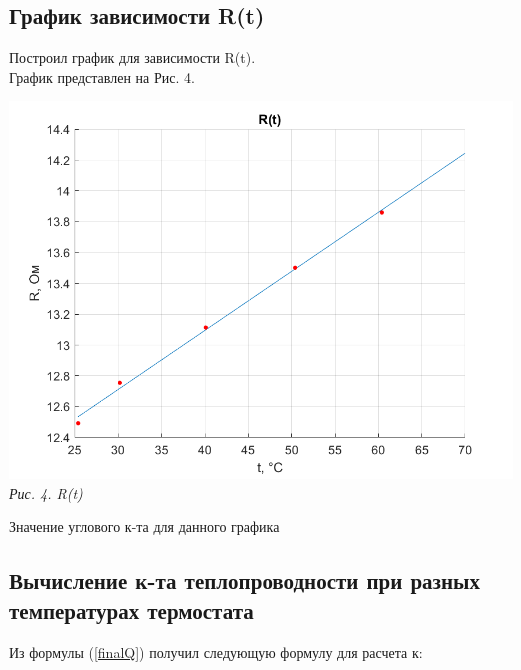 \newpage

\subsection{График зависимости R(t)}

Построил график для зависимости R(t). \\График представлен на Рис. 4. \\

\begin{center}
    \includegraphics[scale = 1.3]{picks/223_R(T).png} \\
    \textit{\textcolor[HTML]{000000}{Рис. 4. R(t)}}
\end{center} 

\vspace{0.5cm}

Значение углового к-та для данного графика 

\newpage

\subsection{Вычисление к-та теплопроводности при разных температурах термостата }

Из формулы (\ref{finalQ}) получил следующую формулу для расчета к: \\[0.2cm] 

\noindent{} \\[0.2cm]

